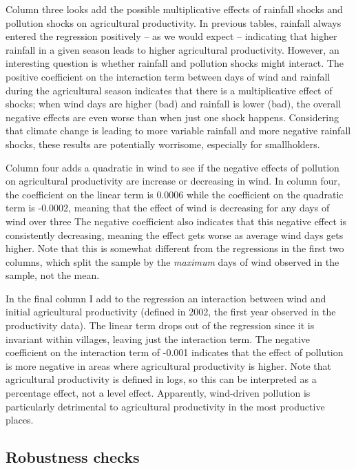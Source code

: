 \documentclass[
]{article}
\begin{document}
Column three looks add the possible multiplicative effects of rainfall shocks and pollution shocks on agricultural productivity. In previous tables, rainfall always entered the regression positively -- as we would expect -- indicating that higher rainfall in a given season leads to higher agricultural productivity. However, an interesting question is whether rainfall and pollution shocks might interact. The positive coefficient on the interaction term between days of wind and rainfall during the agricultural season indicates that there is a multiplicative effect of shocks; when wind days are higher (bad) and rainfall is lower (bad), the overall negative effects are even worse than when just one shock happens. Considering that climate change is leading to more variable rainfall and more negative rainfall shocks, these results are potentially worrisome, especially for smallholders.

Column four adds a quadratic in wind to see if the negative effects of pollution on agricultural productivity are increase or decreasing in wind. In column four, the coefficient on the linear term is 0.0006 while the coefficient on the quadratic term is -0.0002, meaning that the effect of wind is decreasing for any days of wind over three The negative coefficient also indicates that this negative effect is consistently decreasing, meaning the effect gets worse as average wind days gets higher. Note that this is somewhat different from the regressions in the first two columns, which split the sample by the \emph{maximum} days of wind observed in the sample, not the mean.

In the final column I add to the regression an interaction between wind and initial agricultural productivity (defined in 2002, the first year observed in the productivity data). The linear term drops out of the regression since it is invariant within villages, leaving just the interaction term. The negative coefficient on the interaction term of -0.001 indicates that the effect of pollution is more negative in areas where agricultural productivity is higher. Note that agricultural productivity is defined in logs, so this can be interpreted as a percentage effect, not a level effect. Apparently, wind-driven pollution is particularly detrimental to agricultural productivity in the most productive places.

\hypertarget{robustness-checks}{%
\subsection{Robustness checks}\label{robustness-checks}}
\end{document}

